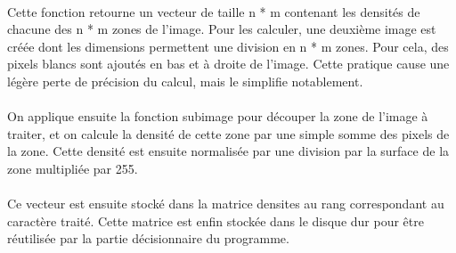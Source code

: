 \paragraph{}
Cette fonction retourne un vecteur de taille n * m contenant les densités de chacune des n * m zones de l'image. Pour les calculer, une deuxième image 
est créée dont les dimensions permettent une division en n * m zones. Pour cela, des pixels blancs sont ajoutés en bas et à droite de l'image. Cette pratique 
cause une légère perte de précision du calcul, mais le simplifie notablement.

\paragraph{}
On applique ensuite la fonction subimage pour découper la zone de l'image à traiter, et on calcule la densité de cette zone par une simple somme des pixels 
de la zone. Cette densité est ensuite normalisée par une division par la surface de la zone multipliée par 255.

\paragraph{}
Ce vecteur est ensuite stocké dans la matrice densites au rang correspondant au caractère traité. Cette matrice est enfin stockée dans le disque dur pour 
être réutilisée par la partie décisionnaire du programme.






